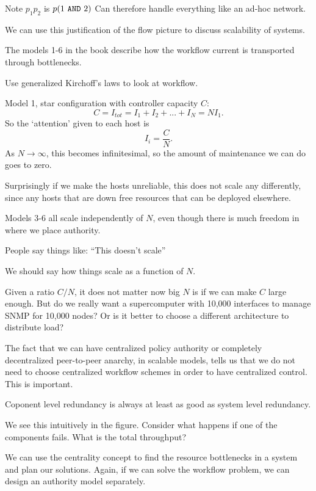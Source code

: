 \documentclass{slides}
\begin{document}
Note $p_1p_2$ is $p(1~ {\tt AND}~ 2)$
Can therefore handle everything like an ad-hoc network.


We can use this justification of the flow picture to discuss
scalability of systems.

The models 1-6 in the book describe how the workflow current is
transported through bottlenecks.

Use generalized Kirchoff's laws to look at workflow.


Model 1, star configuration with controller capacity $C$:
$$
C = I_{tot} = I_1+I_2 + ... + I_N = N I_1.
$$
So the `attention' given to each host is 
$$
I_i = \frac{C}{N}.
$$
As $N\rightarrow \infty$, this becomes infinitesimal, so the amount of
maintenance we can do goes to zero.


Surprisingly if we make the hosts unreliable, this does not scale
any differently, since any hosts that are down free resources that can be
deployed elsewhere.


Models 3-6 all scale independently of $N$, even though there is
much freedom in where we place authority.



People say things like: ``This doesn't scale''

We should say how things scale as a function of $N$.

Given a ratio $C/N$, it does not matter now big $N$ is if we can make
$C$ large enough. But do we really want a supercomputer with 10,000
interfaces to manage SNMP for 10,000 nodes? Or is it better to choose
a different architecture to distribute load?

The fact that we can have centralized policy authority or completely
decentralized peer-to-peer anarchy, in scalable models, tells us that
we do not need to choose centralized workflow schemes in order to have
centralized control. This is important.



Coponent level redundancy is always at least as good as system level
redundancy.


We see this intuitively in the figure. Consider what happens if
one of the components fails. What is the total throughput?


We can use the centrality concept to find the resource bottlenecks
in a system and plan our solutions. Again, if we can solve the workflow
problem, we can design an authority model separately.
\end{document}
